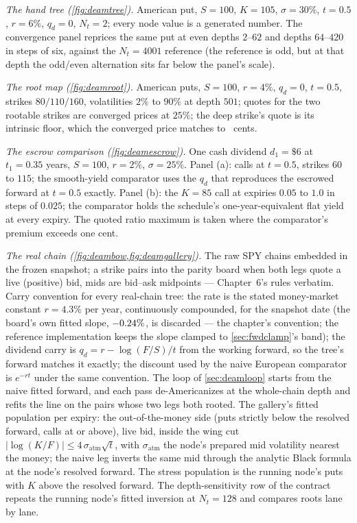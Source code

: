 \emph{The hand tree (\cref{fig:deamtree}).}  American put, $S=100$,
$K=105$, $\sigma=30\%$, $t=0.5$, $r=6\%$, $q_d=0$, $N_t=2$; every
node value is a generated number.  The convergence panel reprices the
same put at even depths $2$--$62$ and depths $64$--$420$ in steps of
six, against the $N_t=4001$ reference (the reference is odd, but at
that depth the odd/even alternation sits far below the panel's
scale).

\emph{The root map (\cref{fig:deamroot}).}  American puts, $S=100$,
$r=4\%$, $q_d=0$, $t=0.5$, strikes $80/110/160$, volatilities $2\%$
to $90\%$ at depth $501$; quotes for the two rootable strikes are
converged prices at $25\%$; the deep strike's quote is its intrinsic
floor, which the converged price matches to
\MacDeamRootPlateauGapCents\ cents.

\emph{The escrow comparison (\cref{fig:deamescrow}).}  One cash
dividend $d_1=\$6$ at $t_1=0.35$ years, $S=100$, $r=2\%$,
$\sigma=25\%$.  Panel (a): calls at $t=0.5$, strikes $60$ to $115$;
the smooth-yield comparator uses the $q_d$ that reproduces the
escrowed forward at $t=0.5$ exactly.  Panel (b): the $K=85$ call at
expiries $0.05$ to $1.0$ in steps of $0.025$; the comparator holds
the schedule's one-year-equivalent flat yield at every expiry.  The
quoted ratio maximum is taken where the comparator's premium exceeds
one cent.

\emph{The real chain (\cref{fig:deambow,fig:deamgallery}).}  The raw
SPY chains embedded in the frozen snapshot; a strike pairs into the
parity board when both legs quote a live (positive) bid, mids are
bid--ask midpoints --- Chapter~6's rules verbatim.  Carry convention
for every real-chain tree: the rate is the stated money-market
constant $r=4.3\%$ per year, continuously compounded, for the
snapshot date (the board's own fitted slope,
$-0.24\%$, is discarded --- the chapter's
convention; the reference implementation keeps the slope clamped to
\cref{sec:fwdclamp}'s band); the dividend carry is
$q_d=r-\log(F/S)/t$ from the working forward, so the tree's forward
matches it exactly; the discount used by the naive European
comparator is $e^{-rt}$ under the same convention.  The loop of
\cref{sec:deamloop} starts from the naive fitted forward, and each
pass de-Americanizes at the whole-chain depth and refits the line on
the pairs whose two legs both rooted.  The gallery's fitted population per
expiry: the out-of-the-money side (puts strictly below the resolved
forward, calls at or above), live bid, inside the wing cut
$|\log(K/F)|\le4\,\sigma_{\text{atm}}\sqrt{t}$, with
$\sigma_{\text{atm}}$ the node's prepared mid volatility nearest the
money; the naive leg inverts the same mid through the analytic Black
formula at the node's resolved forward.  The stress population is
the running node's puts with $K$ above the resolved forward.  The
depth-sensitivity row of the contract repeats the running node's
fitted inversion at $N_t=128$ and compares roots lane by lane.

